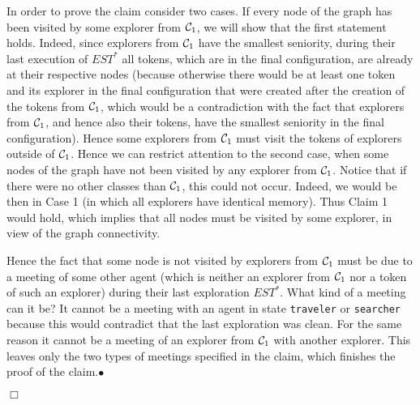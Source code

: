 \documentclass[11pt]{article}
\newcommand{\finclaim}{\hfill $\bullet$}
\newcommand{\qed}{\hfill $\Box$ \bigbreak}
\newenvironment{proof}{\noindent {\bf Proof.}}{\qed}
\newcommand{\cC}{{\cal C}}
\begin{document}
\begin{proof}
In order to prove the claim consider two cases. If every node of the graph has been visited by some explorer from $\cC_1$, we will show that the
first statement holds. Indeed, since explorers from $\cC_1$ have the smallest seniority, during their last execution of  $EST^*$ all tokens{, which are in the final configuration,} are already at 
their respective nodes {(because otherwise there would be at least one token and its explorer in the final configuration that were created after the creation of the tokens from $\cC_1$, which would be a contradiction with the fact that explorers from $\cC_1$, and hence also their tokens, have the smallest seniority in the final configuration)}. Hence some explorers from $\cC_1$ must visit the tokens of explorers outside of $\cC_1$. Hence we can restrict attention
to the second case, when some nodes of the graph have not been visited by any explorer from $\cC_1$. Notice that if there were no other classes than
$\cC_1$, this could not occur. Indeed, we would be then in Case 1 (in which all explorers have identical memory). Thus Claim 1 would hold, which implies
that all nodes must be visited by some explorer, in view of the graph connectivity. 

Hence the fact that some node is not visited by explorers from $\cC_1$ must be due to a meeting of some other agent
(which is neither an explorer from  $\cC_1$ nor a token of such an explorer) during their last exploration $EST^*$.
What kind of a meeting can it be? It cannot be a meeting with an agent in state {\tt traveler} or {\tt searcher} because this would contradict that the last exploration
was clean. For the same reason it cannot be a meeting of an explorer from $\cC_1$ with another explorer. This leaves only the two types of meetings specified in the claim, which finishes the proof of the claim.\finclaim


\end{proof}
\end{document}

